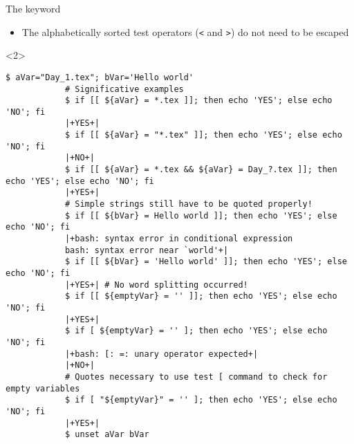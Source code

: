 \begin{frame}[fragile]{The \bash{[[} keyword}
\begin{itemize}[<only@1>]
        \item The alphabetically sorted test operators (\texttt{<} and \texttt{>}) do not need to be escaped
    \end{itemize}
    \begin{onlyenv}<2>
        \begin{lstlisting}[style=MyBash, style=oddnumbers, style=smaller, xleftmargin=1mm, xrightmargin=1mm]
            $ aVar="Day_1.tex"; bVar='Hello world'
            # Significative examples
            $ if [[ ${aVar} = *.tex ]]; then echo 'YES'; else echo 'NO'; fi
            |+YES+|
            $ if [[ ${aVar} = "*.tex" ]]; then echo 'YES'; else echo 'NO'; fi
            |+NO+|
            $ if [[ ${aVar} = *.tex && ${aVar} = Day_?.tex ]]; then echo 'YES'; else echo 'NO'; fi
            |+YES+|
            # Simple strings still have to be quoted properly!
            $ if [[ ${bVar} = Hello world ]]; then echo 'YES'; else echo 'NO'; fi
            |+bash: syntax error in conditional expression
            bash: syntax error near `world'+|
            $ if [[ ${bVar} = 'Hello world' ]]; then echo 'YES'; else echo 'NO'; fi
            |+YES+| # No word splitting occurred!
            $ if [[ ${emptyVar} = '' ]]; then echo 'YES'; else echo 'NO'; fi
            |+YES+|
            $ if [ ${emptyVar} = '' ]; then echo 'YES'; else echo 'NO'; fi
            |+bash: [: =: unary operator expected+|
            |+NO+|
            # Quotes necessary to use test [ command to check for empty variables
            $ if [ "${emptyVar}" = '' ]; then echo 'YES'; else echo 'NO'; fi
            |+YES+|
            $ unset aVar bVar
        \end{lstlisting}
    \end{onlyenv}
\end{frame}
